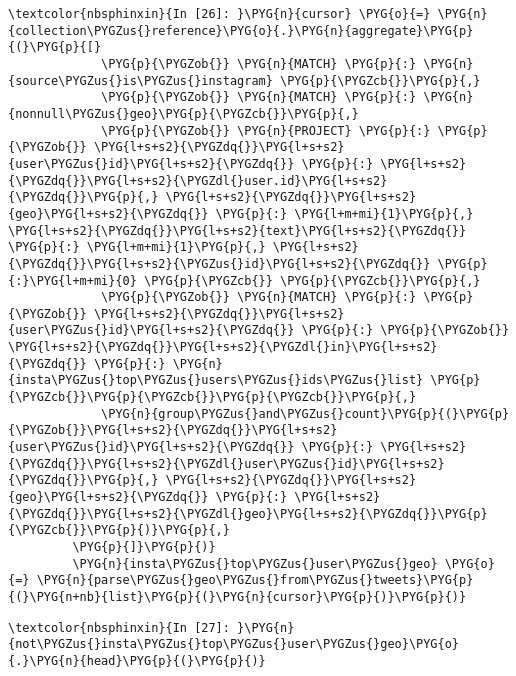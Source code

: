 \documentclass[letterpaper,10pt,english]{sphinxmanual}
\begin{document}
%
\begin{Verbatim}[commandchars=\\\{\}]
\textcolor{nbsphinxin}{In [26]: }\PYG{n}{cursor} \PYG{o}{=} \PYG{n}{collection\PYGZus{}reference}\PYG{o}{.}\PYG{n}{aggregate}\PYG{p}{(}\PYG{p}{[}
             \PYG{p}{\PYGZob{}} \PYG{n}{MATCH} \PYG{p}{:} \PYG{n}{source\PYGZus{}is\PYGZus{}instagram} \PYG{p}{\PYGZcb{}}\PYG{p}{,}
             \PYG{p}{\PYGZob{}} \PYG{n}{MATCH} \PYG{p}{:} \PYG{n}{nonnull\PYGZus{}geo}\PYG{p}{\PYGZcb{}}\PYG{p}{,}
             \PYG{p}{\PYGZob{}} \PYG{n}{PROJECT} \PYG{p}{:} \PYG{p}{\PYGZob{}} \PYG{l+s+s2}{\PYGZdq{}}\PYG{l+s+s2}{user\PYGZus{}id}\PYG{l+s+s2}{\PYGZdq{}} \PYG{p}{:} \PYG{l+s+s2}{\PYGZdq{}}\PYG{l+s+s2}{\PYGZdl{}user.id}\PYG{l+s+s2}{\PYGZdq{}}\PYG{p}{,} \PYG{l+s+s2}{\PYGZdq{}}\PYG{l+s+s2}{geo}\PYG{l+s+s2}{\PYGZdq{}} \PYG{p}{:} \PYG{l+m+mi}{1}\PYG{p}{,} \PYG{l+s+s2}{\PYGZdq{}}\PYG{l+s+s2}{text}\PYG{l+s+s2}{\PYGZdq{}} \PYG{p}{:} \PYG{l+m+mi}{1}\PYG{p}{,} \PYG{l+s+s2}{\PYGZdq{}}\PYG{l+s+s2}{\PYGZus{}id}\PYG{l+s+s2}{\PYGZdq{}} \PYG{p}{:}\PYG{l+m+mi}{0} \PYG{p}{\PYGZcb{}} \PYG{p}{\PYGZcb{}}\PYG{p}{,}
             \PYG{p}{\PYGZob{}} \PYG{n}{MATCH} \PYG{p}{:} \PYG{p}{\PYGZob{}} \PYG{l+s+s2}{\PYGZdq{}}\PYG{l+s+s2}{user\PYGZus{}id}\PYG{l+s+s2}{\PYGZdq{}} \PYG{p}{:} \PYG{p}{\PYGZob{}} \PYG{l+s+s2}{\PYGZdq{}}\PYG{l+s+s2}{\PYGZdl{}in}\PYG{l+s+s2}{\PYGZdq{}} \PYG{p}{:} \PYG{n}{insta\PYGZus{}top\PYGZus{}users\PYGZus{}ids\PYGZus{}list} \PYG{p}{\PYGZcb{}}\PYG{p}{\PYGZcb{}}\PYG{p}{\PYGZcb{}}\PYG{p}{,}
             \PYG{n}{group\PYGZus{}and\PYGZus{}count}\PYG{p}{(}\PYG{p}{\PYGZob{}}\PYG{l+s+s2}{\PYGZdq{}}\PYG{l+s+s2}{user\PYGZus{}id}\PYG{l+s+s2}{\PYGZdq{}} \PYG{p}{:} \PYG{l+s+s2}{\PYGZdq{}}\PYG{l+s+s2}{\PYGZdl{}user\PYGZus{}id}\PYG{l+s+s2}{\PYGZdq{}}\PYG{p}{,} \PYG{l+s+s2}{\PYGZdq{}}\PYG{l+s+s2}{geo}\PYG{l+s+s2}{\PYGZdq{}} \PYG{p}{:} \PYG{l+s+s2}{\PYGZdq{}}\PYG{l+s+s2}{\PYGZdl{}geo}\PYG{l+s+s2}{\PYGZdq{}}\PYG{p}{\PYGZcb{}}\PYG{p}{)}\PYG{p}{,}
         \PYG{p}{]}\PYG{p}{)}
         \PYG{n}{insta\PYGZus{}top\PYGZus{}user\PYGZus{}geo} \PYG{o}{=} \PYG{n}{parse\PYGZus{}geo\PYGZus{}from\PYGZus{}tweets}\PYG{p}{(}\PYG{n+nb}{list}\PYG{p}{(}\PYG{n}{cursor}\PYG{p}{)}\PYG{p}{)}
\end{Verbatim}

%
\begin{Verbatim}[commandchars=\\\{\}]
\textcolor{nbsphinxin}{In [27]: }\PYG{n}{not\PYGZus{}insta\PYGZus{}top\PYGZus{}user\PYGZus{}geo}\PYG{o}{.}\PYG{n}{head}\PYG{p}{(}\PYG{p}{)}
\end{Verbatim}
\end{document}
